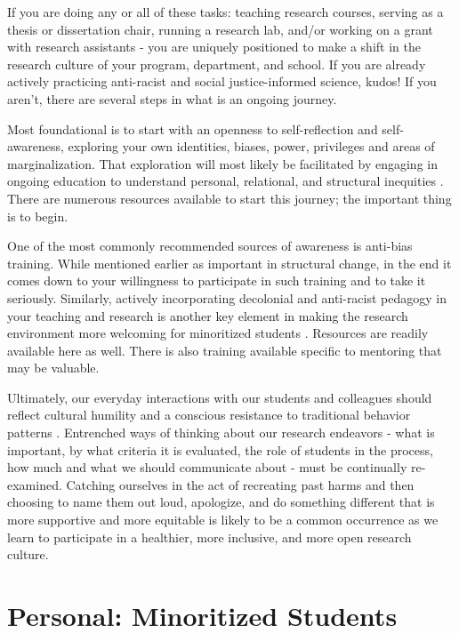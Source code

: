 \documentclass[
  11pt,
]{book}
\begin{document}
If you are doing any or all of these tasks: teaching research courses, serving as a thesis or dissertation chair, running a research lab, and/or working on a grant with research assistants - you are uniquely positioned to make a shift in the research culture of your program, department, and school. If you are already actively practicing anti-racist and social justice-informed science, kudos! If you aren't, there are several steps in what is an ongoing journey.

Most foundational is to start with an openness to self-reflection and self-awareness, exploring your own identities, biases, power, privileges and areas of marginalization. That exploration will most likely be facilitated by engaging in ongoing education to understand personal, relational, and structural inequities \citep{galan_editorial_2021, perez-lopez_ten_2022, talusan_identity-conscious_2022, tung_making_2023, watkins_engaging_2018}. There are numerous resources available to start this journey; the important thing is to begin.

One of the most commonly recommended sources of awareness is anti-bias training. While mentioned earlier as important in structural change, in the end it comes down to your willingness to participate in such training and to take it seriously. Similarly, actively incorporating decolonial and anti-racist pedagogy in your teaching and research is another key element in making the research environment more welcoming for minoritized students \citep{kent_recommendations_2022, perez-lopez_ten_2022, posselt_rigor_2018, talusan_identity-conscious_2022}. Resources are readily available here as well. There is also training available specific to mentoring that may be valuable.

Ultimately, our everyday interactions with our students and colleagues should reflect cultural humility and a conscious resistance to traditional behavior patterns \citep{tung_making_2023}. Entrenched ways of thinking about our research endeavors - what is important, by what criteria it is evaluated, the role of students in the process, how much and what we should communicate about - must be continually re-examined. Catching ourselves in the act of recreating past harms and then choosing to name them out loud, apologize, and do something different that is more supportive and more equitable is likely to be a common occurrence as we learn to participate in a healthier, more inclusive, and more open research culture.

\section{Personal: Minoritized Students}\label{personal-minoritized-students}
\end{document}
